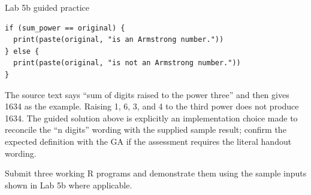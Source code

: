 \begin{labproject}{Lab 5b guided practice}
\begin{lstlisting}[style=dsr]
if (sum_power == original) {
  print(paste(original, "is an Armstrong number."))
} else {
  print(paste(original, "is not an Armstrong number."))
}
\end{lstlisting}

\begin{pitfall}
The source text says ``sum of digits raised to the power three'' and then gives 1634 as the example. Raising 1, 6, 3, and 4 to the third power does not produce 1634. The guided solution above is explicitly an implementation choice made to reconcile the ``n digits'' wording with the supplied sample result; confirm the expected definition with the GA if the assessment requires the literal handout wording.
\end{pitfall}
\end{labproject}

\begin{labdeliverable}
Submit three working R programs and demonstrate them using the sample inputs shown in Lab 5b where applicable.
\end{labdeliverable}
